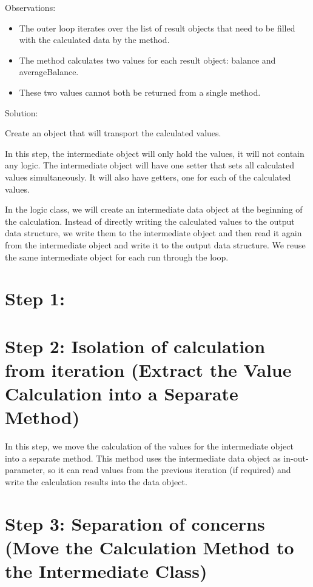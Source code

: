 \documentclass[a4paper,fleqn,titlepage,11pt]{article}
\begin{document}
Observations:
\begin{itemize}
\item The outer loop iterates over the list of result objects that need to be filled with the calculated data by the method.
\item The method calculates two values for each result object: balance and averageBalance. 
\item These two values cannot both be returned from a single method.
\end{itemize}

Solution:

Create an object that will transport the calculated values. 

In this step, the intermediate object will only hold the values, it will not contain any logic. The intermediate object will have one setter that sets all calculated values simultaneously. It will also have getters, one for each of the calculated values.

In the logic class, we will create an intermediate data object at the beginning of the calculation. Instead of directly writing the calculated values to the output data structure, we write them to the intermediate object and then read it again from the intermediate object and write it to the output data structure. We reuse the same intermediate object for each run through the loop.

\section{Step 1: }



\section{Step 2: Isolation of calculation from iteration (Extract the Value Calculation into a Separate Method)}

In this step, we move the calculation of the values for the intermediate object into a separate method. This method uses the intermediate data object as in-out-parameter, so it can read values from the previous iteration (if required) and write the calculation results into the data object.

\section{Step 3: Separation of concerns (Move the Calculation Method to the Intermediate Class)}
\end{document}
